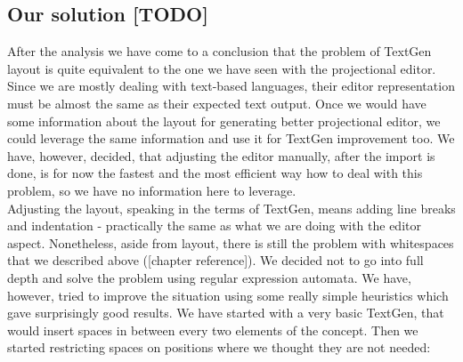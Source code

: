 \subsection{Our solution [TODO]}
After the analysis we have come to a conclusion that the problem of TextGen layout is quite equivalent to the one we have seen with the projectional editor. Since we are mostly dealing with text-based languages, their editor representation must be almost the same as their expected text output. Once we would have some information about the layout for generating better projectional editor, we could leverage the same information and use it for TextGen improvement too. We have, however, decided, that adjusting the editor manually, after the import is done, is for now the fastest and the most efficient way how to deal with this problem, so we have no information here to leverage. 
\\

Adjusting the layout, speaking in the terms of TextGen, means adding line breaks and indentation - practically the same as what we are doing with the editor aspect. Nonetheless, aside from layout, there is still the problem with whitespaces that we described above ([chapter reference]). We decided not to go into full depth and solve the problem using regular expression automata. We have, however, tried to improve the situation using some really simple heuristics which gave surprisingly good results.
We have started with a very basic TextGen, that would insert spaces in between every two elements of the concept. Then we started restricting spaces on positions where we thought they are not needed:

